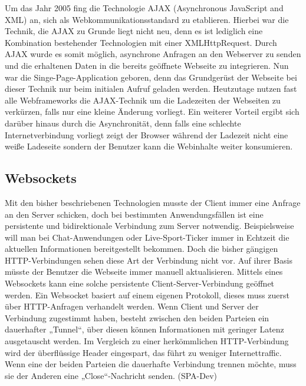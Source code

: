 Um das Jahr 2005 fing die Technologie AJAX (Asynchronous JavaScript and XML) an, sich als Webkommunikationsstandard zu etablieren. Hierbei war die Technik, die AJAX zu Grunde liegt nicht neu, denn es ist lediglich eine Kombination bestehender Technologien mit einer XMLHttpRequest. Durch AJAX wurde es somit möglich, asynchrone Anfragen an den Webserver zu senden und die erhaltenen Daten in die bereits geöffnete Webseite zu integrieren. Nun war die Singe-Page-Application geboren, denn das Grundgerüst der Webseite bei dieser Technik nur beim initialen Aufruf geladen werden. Heutzutage nutzen fast alle Webframeworks die AJAX-Technik um die Ladezeiten der Webseiten zu verkürzen, falls nur eine kleine Änderung vorliegt. Ein weiterer Vorteil ergibt sich darüber hinaus durch die Asynchronität, denn falls eine schlechte Internetverbindung vorliegt zeigt der Browser während der Ladezeit nicht eine weiße Ladeseite sondern der Benutzer kann die Webinhalte weiter konsumieren. 

\subsection{Websockets}

Mit den bisher beschriebenen Technologien musste der Client immer eine Anfrage an den Server schicken, doch bei bestimmten Anwendungsfällen ist eine persistente und bidirektionale Verbindung zum Server notwendig. Beispielsweise will man bei Chat-Anwendungen oder Live-Sport-Ticker immer in Echtzeit die aktuellen Informationen bereitgestellt bekommen. Doch die bisher gängigen HTTP-Verbindungen sehen diese Art der Verbindung nicht vor. Auf ihrer Basis müsste der Benutzer die Webseite immer manuell aktualisieren. Mittels eines Websockets kann eine solche persistente Client-Server-Verbindung geöffnet werden. Ein Websocket basiert auf einem eigenen Protokoll, dieses muss zuerst über HTTP-Anfragen verhandelt werden. Wenn Client und Server der Verbindung zugestimmt haben, besteht zwischen den beiden Parteien ein dauerhafter „Tunnel“, über diesen können Informationen mit geringer Latenz ausgetauscht werden. Im Vergleich zu einer herkömmlichen HTTP-Verbindung wird der überflüssige Header eingespart, das führt zu weniger Internettraffic. Wenn eine der beiden Parteien die dauerhafte Verbindung trennen möchte, muss sie der Anderen eine „Close“-Nachricht senden. (SPA-Dev)

